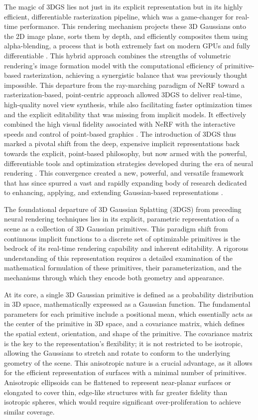 \documentclass[11pt]{article}
\begin{document}
The magic of 3DGS lies not just in its explicit representation but in its highly efficient, differentiable rasterization pipeline, which was a game-changer for real-time performance. This rendering mechanism projects these 3D Gaussians onto the 2D image plane, sorts them by depth, and efficiently composites them using alpha-blending, a process that is both extremely fast on modern GPUs and fully differentiable \cite{ref2}. This hybrid approach combines the strengths of volumetric rendering's image formation model with the computational efficiency of primitive-based rasterization, achieving a synergistic balance that was previously thought impossible. This departure from the ray-marching paradigm of NeRF toward a rasterization-based, point-centric approach allowed 3DGS to deliver real-time, high-quality novel view synthesis, while also facilitating faster optimization times and the explicit editability that was missing from implicit models. It effectively combined the high visual fidelity associated with NeRF with the interactive speeds and control of point-based graphics \cite{ref1,ref7}. The introduction of 3DGS thus marked a pivotal shift from the deep, expensive implicit representations back towards the explicit, point-based philosophy, but now armed with the powerful, differentiable tools and optimization strategies developed during the era of neural rendering \cite{ref5}. This convergence created a new, powerful, and versatile framework that has since spurred a vast and rapidly expanding body of research dedicated to enhancing, applying, and extending Gaussian-based representations \cite{ref8}.

The foundational departure of 3D Gaussian Splatting (3DGS) from preceding neural rendering techniques lies in its explicit, parametric representation of a scene as a collection of 3D Gaussian primitives. This paradigm shift from continuous implicit functions to a discrete set of optimizable primitives is the bedrock of its real-time rendering capability and inherent editability. A rigorous understanding of this representation requires a detailed examination of the mathematical formulation of these primitives, their parameterization, and the mechanisms through which they encode both geometry and appearance.

At its core, a single 3D Gaussian primitive is defined as a probability distribution in 3D space, mathematically expressed as a Gaussian function. The fundamental parameters for each primitive include a positional mean, which essentially acts as the center of the primitive in 3D space, and a covariance matrix, which defines the spatial extent, orientation, and shape of the primitive. The covariance matrix is the key to the representation's flexibility; it is not restricted to be isotropic, allowing the Gaussians to stretch and rotate to conform to the underlying geometry of the scene. This anisotropic nature is a crucial advantage, as it allows for the efficient representation of surfaces with a minimal number of primitives. Anisotropic ellipsoids can be flattened to represent near-planar surfaces or elongated to cover thin, edge-like structures with far greater fidelity than isotropic spheres, which would require significant over-proliferation to achieve similar coverage.
\end{document}
